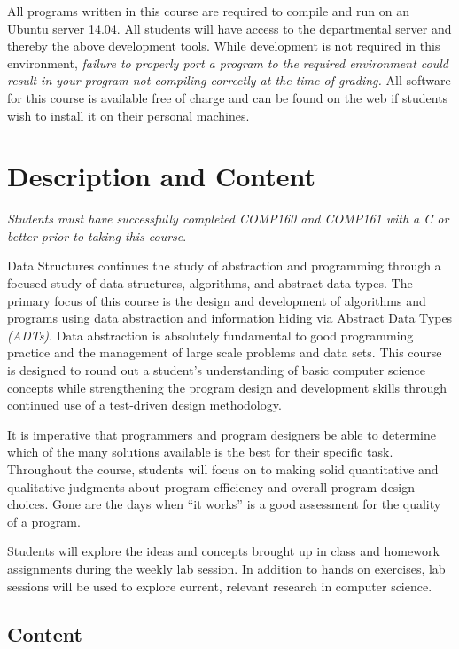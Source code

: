 \documentclass[10pt]{article}
\begin{document}
All programs written in this course are required to compile and run on an Ubuntu server 14.04.  All students will have access to the departmental server and thereby the above development tools.  While development is not required in this environment, \emph{failure to properly port a program to the required environment could result in your program not compiling correctly at the time of grading.}  All software for this course is available free of charge and can be found on the web if students wish to install it on their personal machines.  

\section{Description and Content}

\emph{Students must have successfully completed COMP160 and COMP161 with a C or better prior to taking this course}.

Data Structures continues the study of abstraction and programming through a focused study of data structures, algorithms, and abstract data types.  The primary focus of this course is the design and development of algorithms and programs using data abstraction and information hiding via Abstract Data Types \textit{(ADTs)}.  Data abstraction is absolutely fundamental to good programming practice and the management of large scale problems and data sets.  This course is designed to round out a student's understanding of basic computer science concepts while strengthening the program design and development skills through continued use of a test-driven design methodology.

It is imperative that programmers and program designers be able to determine which of the many solutions available is the best for their specific task.  Throughout the course, students will focus on to making solid quantitative and qualitative judgments about program efficiency and overall program design choices.  Gone are the days when ``it works'' is a good assessment for the quality of a program.

Students will explore the ideas and concepts brought up in class and homework assignments during the weekly lab session.  In addition to hands on exercises, lab sessions will be used to explore current, relevant research in computer science.

\subsection{Content}
\end{document}
